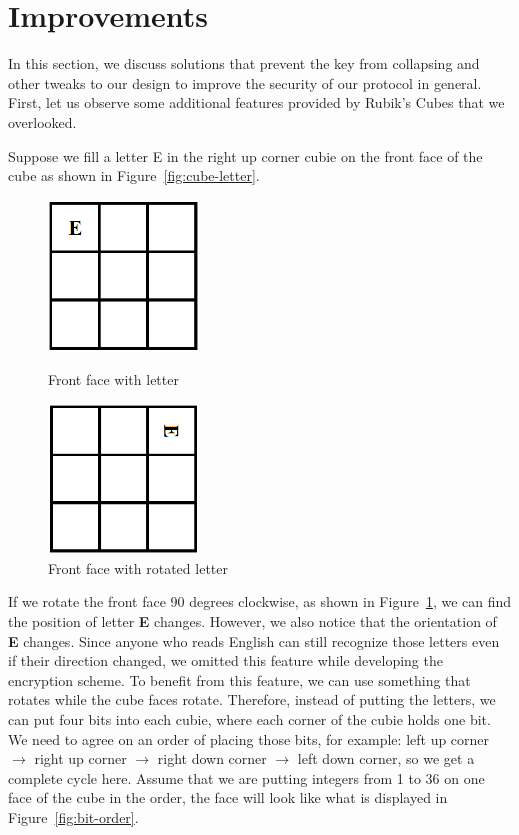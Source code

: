 \section{Improvements}
\par In this section, we discuss solutions that prevent the key from collapsing and other tweaks to our design to improve the security of our protocol in general. First, let us observe some additional features provided by Rubik's Cubes that we overlooked. 
\par Suppose we fill a letter E in the right up corner cubie on the front face of the cube as shown in Figure~\ref{fig:cube-letter}.
\begin{figure}[ht]
    \centering
    \begin{minipage}{0.49\textwidth}
        \centering
        \includegraphics[width=4cm]{figures/encryption/cube_face_letter.png}
        \caption{Front face with letter}\label{fig:cube-letter}
    \end{minipage}
    \begin{minipage}{0.49\textwidth}
        \centering
        \includegraphics[width=4cm]{figures/encryption/cube_face_letter_rotate.png}
        \caption{Front face with rotated letter}\label{fig:cube-letter-rotate}
    \end{minipage}
\end{figure}
If we rotate the front face 90 degrees clockwise, as shown in Figure~\ref{fig:cube-letter-rotate}, we can find the position of letter \textbf{E} changes. However, we also notice that the orientation of \textbf{E} changes. Since anyone who reads English can still recognize those letters even if their direction changed, we omitted this feature while developing the encryption scheme. To benefit from this feature, we can use something that rotates while the cube faces rotate. Therefore, instead of putting the letters, we can put four bits into each cubie, where each corner of the cubie holds one bit. We need to agree on an order of placing those bits, for example: left up corner $\rightarrow$ right up corner $\rightarrow$ right down corner $\rightarrow$ left down corner, so we get a complete cycle here. Assume that we are putting integers from 1 to 36 on one face of the cube in the order, the face will look like what is displayed in Figure~\ref{fig:bit-order}.
